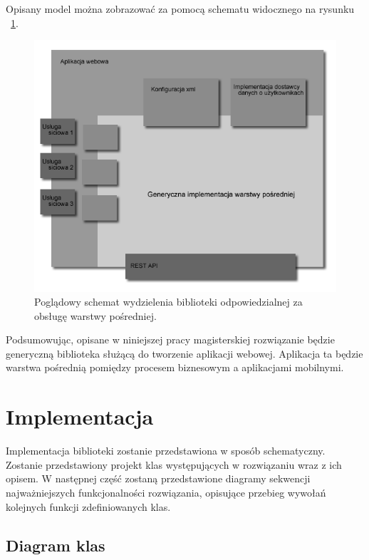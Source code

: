 Opisany model można zobrazować za pomocą schematu widocznego na rysunku ~\ref{fig:middlewareGenericConcept}.

\begin{figure}[h]
\centerline{\includegraphics[scale=0.6]{middlewareGenericConcept}}
\caption{Poglądowy schemat wydzielenia biblioteki odpowiedzialnej za obsługę warstwy pośredniej.}
\label{fig:middlewareGenericConcept}
\end{figure}

Podsumowując, opisane w niniejszej pracy magisterskiej rozwiązanie będzie generyczną biblioteka służącą do tworzenie aplikacji webowej. Aplikacja ta będzie warstwa pośrednią pomiędzy procesem biznesowym a aplikacjami mobilnymi. 


\section{Implementacja}
\label{sec:impl}

Implementacja biblioteki zostanie przedstawiona w sposób schematyczny. Zostanie przedstawiony projekt klas występujących w rozwiązaniu wraz z ich opisem. W następnej część zostaną przedstawione diagramy sekwencji najważniejszych funkcjonalności rozwiązania, opisujące przebieg wywołań kolejnych funkcji zdefiniowanych klas. 

\subsection{Diagram klas}

